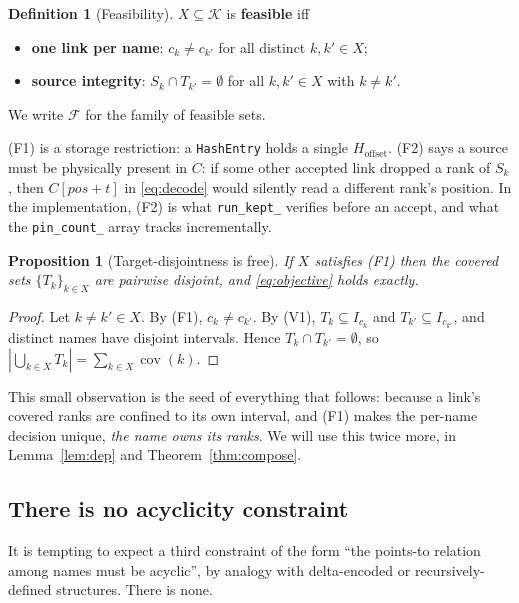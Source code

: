 \documentclass[11pt,a4paper]{article}
\theoremstyle{definition}
\newtheorem{definition}{Definition}
\theoremstyle{plain}
\newtheorem{proposition}[theorem]{Proposition}
\theoremstyle{remark}
\newcommand{\cov}{\operatorname{cov}}
\newcommand{\Feas}{\mathcal{F}}
\newcommand{\Links}{\mathcal{K}}
\begin{document}
\begin{definition}[Feasibility]
\label{def:feasible}
$X \subseteq \Links$ is \textbf{feasible} iff
\begin{itemize}
\item[(F1)] \textbf{one link per name}: $c_k \ne c_{k'}$ for all
  distinct $k,k' \in X$;
\item[(F2)] \textbf{source integrity}: $S_k \cap T_{k'} = \emptyset$ for
  all $k, k' \in X$ with $k \ne k'$.
\end{itemize}
We write $\Feas$ for the family of feasible sets.
\end{definition}

(F1) is a storage restriction: a \texttt{HashEntry} holds a single
$H_{\mathrm{offset}}$. (F2) says a source must be physically present in
$C$: if some other accepted link dropped a rank of $S_k$, then
$C[\mathit{pos}+t]$ in \eqref{eq:decode} would silently read a different
rank's position. In the implementation, (F2) is what
\texttt{run\_kept\_} verifies before an accept, and what the
\texttt{pin\_count\_} array tracks incrementally.

\begin{proposition}[Target-disjointness is free]
\label{prop:target-free}
If $X$ satisfies (F1) then the covered sets $\{T_k\}_{k \in X}$ are
pairwise disjoint, and \eqref{eq:objective} holds exactly.
\end{proposition}

\begin{proof}
Let $k \ne k' \in X$. By (F1), $c_k \ne c_{k'}$. By (V1),
$T_k \subseteq I_{c_k}$ and $T_{k'} \subseteq I_{c_{k'}}$, and distinct
names have disjoint intervals. Hence $T_k \cap T_{k'} = \emptyset$, so
$|\bigcup_{k \in X} T_k| = \sum_{k\in X}\cov(k)$.
\end{proof}

This small observation is the seed of everything that follows: because a
link's covered ranks are confined to its own interval, and (F1) makes the
per-name decision unique, \emph{the name owns its ranks}. We will use
this twice more, in Lemma~\ref{lem:dep} and Theorem~\ref{thm:compose}.

\subsection{There is no acyclicity constraint}
\label{sec:noacyclic}

It is tempting to expect a third constraint of the form ``the
points-to relation among names must be acyclic'', by analogy with
delta-encoded or recursively-defined structures. There is none.
\end{document}
